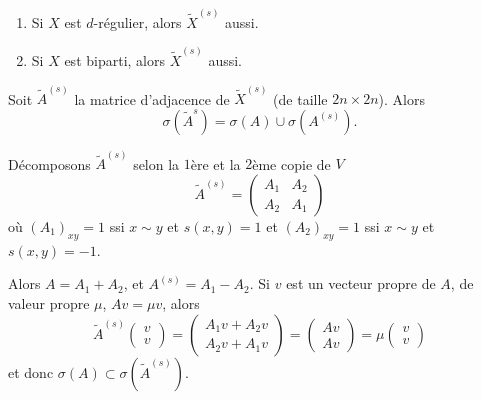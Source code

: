 \begin{exercice}
  \begin{enumerate}
  \item Si $X$ est $d$-régulier, alors $\tilde{X}^{(s)}$ aussi.
  \item Si $X$ est biparti, alors $\tilde{X}^{(s)}$ aussi.
  \end{enumerate}
\end{exercice}


\begin{lem}
  Soit $\tilde{A}^{(s)}$ la matrice d'adjacence de $\tilde{X}^{(s)}$ (de taille $2n \times 2n$). Alors 
  \[ \sigma(\tilde{A}^{s}) = \sigma(A) \cup \sigma(A^{(s)}). \]
\end{lem}

\begin{preuve}
  Décomposons $\tilde{A}^{(s)}$ selon la $1$ère et la $2$ème copie de $V$
  \[ 
    \tilde{A}^{(s)} =
    \begin{pmatrix}
      A_1 & A_2 \\ A_2 & A_1
    \end{pmatrix}
  \]
  où $(A_1)_{xy} = 1$ ssi $x \sim y$ et $s(x,y) = 1$ et $(A_2)_{xy} = 1$ ssi $x \sim y$ et $s(x,y) = -1$.

  Alors $A = A_1 + A_2$, et $A^{(s)} = A_1 - A_2$. Si $v$ est un vecteur propre de $A$, de valeur propre
  $\mu$, $Av = \mu v$, alors 
  \[ \tilde{A}^{(s)}
    \begin{pmatrix}
      v \\ v
    \end{pmatrix} =
    \begin{pmatrix}
      A_1v + A_2 v\\ A_2v + A_1v
    \end{pmatrix} =
    \begin{pmatrix}
      Av \\ Av
    \end{pmatrix} = \mu
    \begin{pmatrix}
      v \\ v
    \end{pmatrix}
  \]
  et donc $\sigma(A) \subset \sigma(\tilde{A}^{(s)})$.


\end{preuve}
